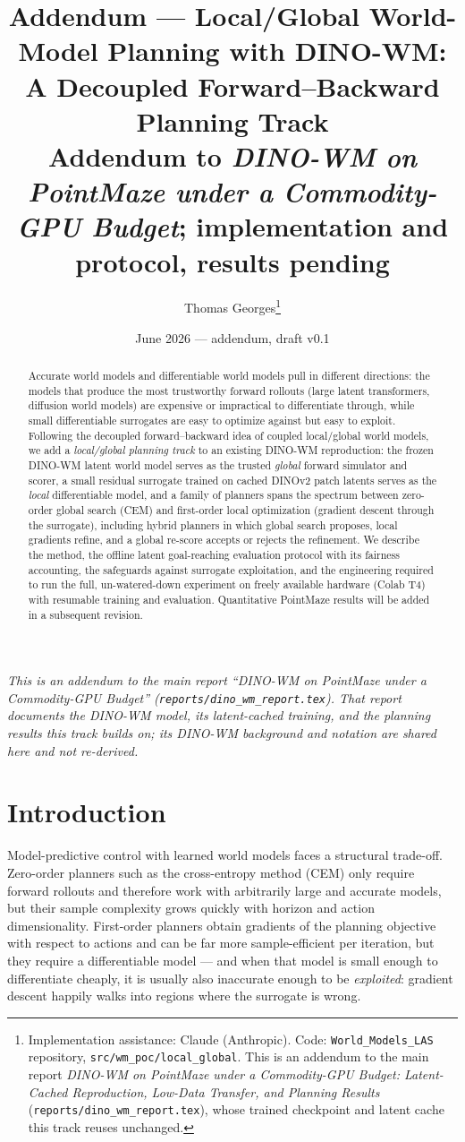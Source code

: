 \documentclass[11pt,a4paper]{article}
\title{Addendum --- Local/Global World-Model Planning with DINO-WM:\\
A Decoupled Forward--Backward Planning Track\\
{\large Addendum to \emph{DINO-WM on PointMaze under a Commodity-GPU Budget};
implementation and protocol, results pending}}
\author{Thomas Georges\thanks{Implementation assistance: Claude (Anthropic). Code:
\texttt{World\_Models\_LAS} repository, \texttt{src/wm\_poc/local\_global}. This is an
addendum to the main report \emph{DINO-WM on PointMaze under a Commodity-GPU
Budget: Latent-Cached Reproduction, Low-Data Transfer, and Planning Results}
(\texttt{reports/dino\_wm\_report.tex}), whose trained checkpoint and latent
cache this track reuses unchanged.}}
\date{June 2026 --- addendum, draft v0.1}
\begin{document}
\maketitle

\noindent\emph{This is an addendum to the main report ``DINO-WM on PointMaze
under a Commodity-GPU Budget'' (\texttt{reports/dino\_wm\_report.tex}). That
report documents the DINO-WM model, its latent-cached training, and the
planning results this track builds on; its DINO-WM background and notation are
shared here and not re-derived.}
\vspace{0.6em}

\begin{abstract}
Accurate world models and differentiable world models pull in different
directions: the models that produce the most trustworthy forward rollouts
(large latent transformers, diffusion world models) are expensive or
impractical to differentiate through, while small differentiable surrogates
are easy to optimize against but easy to exploit. Following the decoupled
forward--backward idea of coupled local/global world models, we add a
\emph{local/global planning track} to an existing DINO-WM reproduction: the
frozen DINO-WM latent world model serves as the trusted \emph{global} forward
simulator and scorer, a small residual surrogate trained on cached DINOv2
patch latents serves as the \emph{local} differentiable model, and a family of
planners spans the spectrum between zero-order global search (CEM) and
first-order local optimization (gradient descent through the surrogate),
including hybrid planners in which global search proposes, local gradients
refine, and a global re-score accepts or rejects the refinement. We describe
the method, the offline latent goal-reaching evaluation protocol with its
fairness accounting, the safeguards against surrogate exploitation, and the
engineering required to run the full, un-watered-down experiment on freely
available hardware (Colab T4) with resumable training and evaluation.
Quantitative PointMaze results will be added in a subsequent revision.
\end{abstract}

\section{Introduction}
\label{sec:intro}

Model-predictive control with learned world models faces a structural
trade-off. Zero-order planners such as the cross-entropy method (CEM) only
require forward rollouts and therefore work with arbitrarily large and
accurate models, but their sample complexity grows quickly with horizon and
action dimensionality. First-order planners obtain gradients of the planning
objective with respect to actions and can be far more sample-efficient per
iteration, but they require a differentiable model --- and when that model is
small enough to differentiate cheaply, it is usually also inaccurate enough to
be \emph{exploited}: gradient descent happily walks into regions where the
surrogate is wrong.
\end{document}
